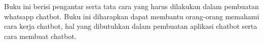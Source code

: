 Buku ini berisi pengantar serta tata cara yang harus dilakukan dalam pembuatan whatsapp chatbot. Buku ini diharapkan dapat membantu orang-orang memahami cara kerja chatbot, hal yang dibutuhkan dalam pembuatan aplikasi chatbot serta cara membuat chatbot.

